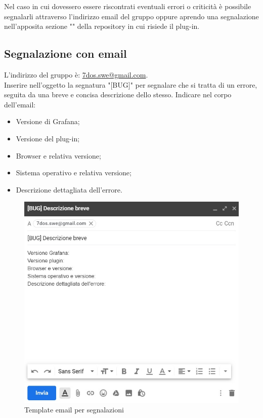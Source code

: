 \pagebreak
{}
Nel caso in cui dovessero essere riscontrati eventuali errori o criticità è possibile segnalarli attraverso l'indirizzo email del gruppo oppure aprendo una segnalazione nell'apposita sezione "" della repository in cui risiede il plug-in.

\subsection{Segnalazione con email}
L'indirizzo del gruppo è: {\url{7dos.swe@gmail.com}}. \\
Inserire nell'oggetto la segnatura "[BUG]" per segnalare che si tratta di un errore, seguita da una breve e concisa descrizione dello stesso.
Indicare nel corpo dell'email:
\begin{itemize}
	\item Versione di Grafana;
	\item Versione del plug-in;
	\item Browser e relativa versione;
	\item Sistema operativo e relativa versione;
	\item Descrizione dettagliata dell'errore.
\end{itemize}

\begin{figure} [H]
	\centering
	\includegraphics[scale=0.9]{Img/email.jpg} 
	\caption{Template email per segnalazioni} \label{} 
\end{figure} 

